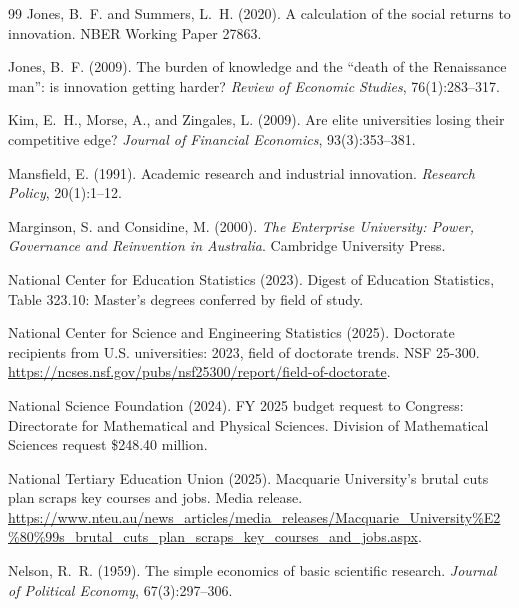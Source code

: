\documentclass[11pt]{article}
\theoremstyle{definition}
\theoremstyle{remark}
\begin{document}
\begin{thebibliography}{99}
Jones, B.~F. and Summers, L.~H. (2020).
\newblock A calculation of the social returns to innovation.
\newblock NBER Working Paper 27863.

Jones, B.~F. (2009).
\newblock The burden of knowledge and the ``death of the Renaissance man'': is innovation getting harder?
\newblock \emph{Review of Economic Studies}, 76(1):283--317.

Kim, E.~H., Morse, A., and Zingales, L. (2009).
\newblock Are elite universities losing their competitive edge?
\newblock \emph{Journal of Financial Economics}, 93(3):353--381.

Mansfield, E. (1991).
\newblock Academic research and industrial innovation.
\newblock \emph{Research Policy}, 20(1):1--12.

Marginson, S. and Considine, M. (2000).
\newblock \emph{The Enterprise University: Power, Governance and Reinvention in Australia}.
\newblock Cambridge University Press.

National Center for Education Statistics (2023).
\newblock Digest of Education Statistics, Table 323.10: Master's degrees conferred by field of study.

National Center for Science and Engineering Statistics (2025).
\newblock Doctorate recipients from U.S. universities: 2023, field of doctorate trends.
\newblock NSF 25-300. \url{https://ncses.nsf.gov/pubs/nsf25300/report/field-of-doctorate}.

National Science Foundation (2024).
\newblock FY 2025 budget request to Congress: Directorate for Mathematical and Physical Sciences.
\newblock Division of Mathematical Sciences request \$248.40 million.

National Tertiary Education Union (2025).
\newblock Macquarie University's brutal cuts plan scraps key courses and jobs.
\newblock Media release. \url{https://www.nteu.au/news_articles/media_releases/Macquarie_University%E2%80%99s_brutal_cuts_plan_scraps_key_courses_and_jobs.aspx}.

Nelson, R.~R. (1959).
\newblock The simple economics of basic scientific research.
\newblock \emph{Journal of Political Economy}, 67(3):297--306.


\end{thebibliography}
\end{document}
